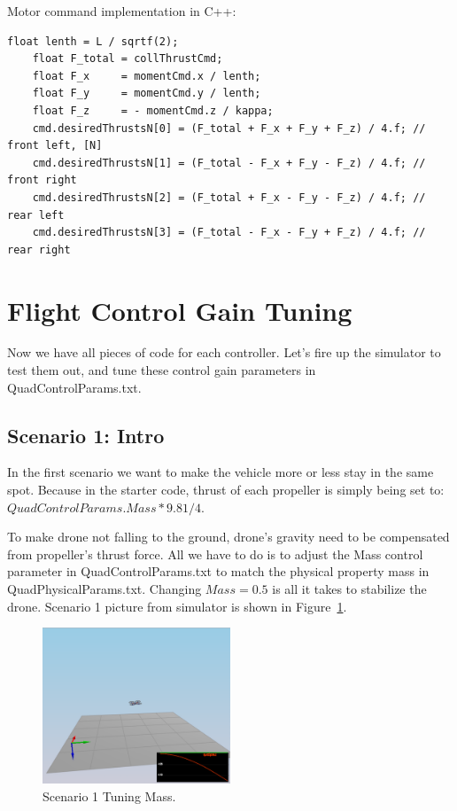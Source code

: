 \documentclass[letterpaper]{article}
\begin{document}
Motor command implementation in C++:
\begin{lstlisting}[frame=single]
    float lenth = L / sqrtf(2);
    float F_total = collThrustCmd;
    float F_x     = momentCmd.x / lenth;
    float F_y     = momentCmd.y / lenth;
    float F_z     = - momentCmd.z / kappa;
    cmd.desiredThrustsN[0] = (F_total + F_x + F_y + F_z) / 4.f; // front left, [N]
    cmd.desiredThrustsN[1] = (F_total - F_x + F_y - F_z) / 4.f; // front right
    cmd.desiredThrustsN[2] = (F_total + F_x - F_y - F_z) / 4.f; // rear left
    cmd.desiredThrustsN[3] = (F_total - F_x - F_y + F_z) / 4.f; // rear right
\end{lstlisting}

\section{Flight Control Gain Tuning}

Now we have all pieces of code for each controller. Let's fire up the simulator to test them out, and tune these control gain parameters in QuadControlParams.txt.

\subsection{Scenario 1: Intro}

In the first scenario we want to make the vehicle more or less stay in the same spot. Because in the starter code, thrust of each propeller is simply being set to: $QuadControlParams.Mass*9.81/4$.

To make drone not falling to the ground, drone's gravity need to be compensated from propeller's thrust force. All we have to do is to adjust the Mass control parameter in QuadControlParams.txt to match the physical property mass in QuadPhysicalParams.txt. Changing $Mass = 0.5$ is all it takes to stabilize the drone. Scenario 1 picture from simulator is shown in Figure~\ref{fig:scenario1}.

\begin{figure}[ht]
\centering
\includegraphics[width=0.5\textwidth]{./fig/scenario1.png}
\caption{\label{fig:scenario1} Scenario 1 Tuning Mass.}
\end{figure}
\end{document}
